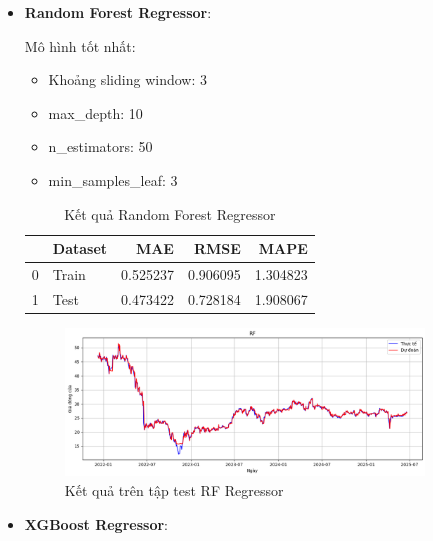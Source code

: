 \begin{itemize}
            \FloatBarrier
            
        \item \textbf{Random Forest Regressor}:

            Mô hình tốt nhất:
            \begin{itemize}
                \item Khoảng sliding window: 3
                \item max\_depth: 10
                \item n\_estimators: 50
                \item min\_samples\_leaf: 3
            \end{itemize}

            \begin{table}[htbp]
                \centering
                \caption{Kết quả Random Forest Regressor}
                \label{tab:stock-close-rf}
                \begin{tabular}{llrrr}
                \hline
                 & Dataset & MAE & RMSE & MAPE \\
                \hline
                0 & Train & 0.525237 & 0.906095 & 1.304823 \\
                1 & Test & 0.473422 & 0.728184 & 1.908067 \\
                \hline
                \end{tabular}
            \end{table}
            
            \FloatBarrier

            \begin{figure}[htp]
                \centering
                \includegraphics[width=0.90\textwidth]{images/TS_stock_pred_cmp_RF.png}
                \caption{Kết quả trên tập test RF Regressor}
                \label{fig:TS_stock_pred_cmp_RF}
            \end{figure}
            \FloatBarrier

        \item \textbf{XGBoost Regressor}:
        

\end{itemize}
